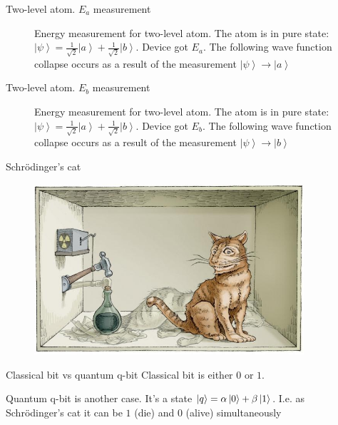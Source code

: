 \documentclass[10pt,pdf,hyperref={unicode}]{beamer}
\begin{document}
\begin{frame}{Two-level atom. $E_a$ measurement}
\begin{figure}
\centering



\caption{Energy measurement for two-level atom. The atom is in pure
  state: $\left|\psi\right> = 
  \frac{1}{\sqrt{2}}\left|a\right> + \frac{1}{\sqrt{2}}\left|b\right>$.
  Device got $E_a$. The following wave function collapse occurs as a
  result of the measurement $\left|\psi\right> \to \left|a\right>$
}
\label{fig:add:mesure_ex_a}
\end{figure}
\end{frame}

\begin{frame}{Two-level atom. $E_b$ measurement}
\begin{figure}
\centering



\caption{Energy measurement for two-level atom. The atom is in pure
  state: $\left|\psi\right> = 
\frac{1}{\sqrt{2}}\left|a\right> + \frac{1}{\sqrt{2}}\left|b\right>$.
Device got $E_b$. The following wave function collapse occurs as a
  result of the measurement $\left|\psi\right> \to \left|b\right>$
}
\label{fig:add:mesure_ex_b}
\end{figure}
\end{frame}

\begin{frame}{Schrödinger's cat}
 \begin{figure} 
   \includegraphics[width=100mm,scale=0.5]{catshred.jpg}
  \end{figure}
\end{frame}

\begin{frame}{Classical bit vs quantum q-bit}
  Classical bit is either $0$ or $1$.

  Quantum q-bit is another case. It's a state
  $\ket{q} = \alpha \ket{0} + \beta \ket{1}$. I.e. as Schrödinger's
  cat it can be $1$ (die) and $0$ (alive) simultaneously
\end{frame}
\end{document}
